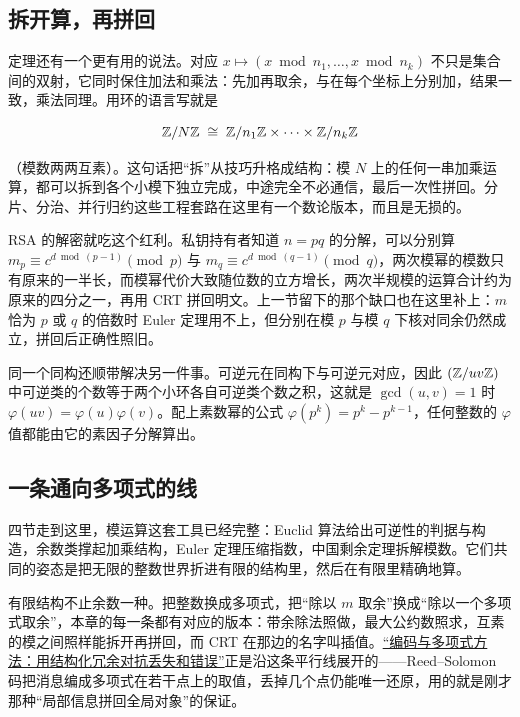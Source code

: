 \subsection{拆开算，再拼回}

定理还有一个更有用的说法。对应 \(x\mapsto(x\bmod n_1,\dots,x\bmod n_k)\) 不只是集合间的双射，它同时保住加法和乘法：先加再取余，与在每个坐标上分别加，结果一致，乘法同理。用环的语言写就是

\[
\mathbb{Z}/N\mathbb{Z}\;\cong\;\mathbb{Z}/n_1\mathbb{Z}\times\cdots\times\mathbb{Z}/n_k\mathbb{Z}
\]

（模数两两互素）。这句话把``拆''从技巧升格成结构：模 \(N\) 上的任何一串加乘运算，都可以拆到各个小模下独立完成，中途完全不必通信，最后一次性拼回。分片、分治、并行归约这些工程套路在这里有一个数论版本，而且是无损的。

RSA 的解密就吃这个红利。私钥持有者知道 \(n=pq\) 的分解，可以分别算 \(m_p\equiv c^{d\bmod(p-1)}\pmod p\) 与 \(m_q\equiv c^{d\bmod(q-1)}\pmod q\)，两次模幂的模数只有原来的一半长，而模幂代价大致随位数的立方增长，两次半规模的运算合计约为原来的四分之一，再用 CRT 拼回明文。上一节留下的那个缺口也在这里补上：\(m\) 恰为 \(p\) 或 \(q\) 的倍数时 Euler 定理用不上，但分别在模 \(p\) 与模 \(q\) 下核对同余仍然成立，拼回后正确性照旧。

同一个同构还顺带解决另一件事。可逆元在同构下与可逆元对应，因此 \((\mathbb{Z}/uv\mathbb{Z})\) 中可逆类的个数等于两个小环各自可逆类个数之积，这就是 \(\gcd(u,v)=1\) 时 \(\varphi(uv)=\varphi(u)\varphi(v)\)。配上素数幂的公式 \(\varphi(p^{k})=p^{k}-p^{k-1}\)，任何整数的 \(\varphi\) 值都能由它的素因子分解算出。

\subsection{一条通向多项式的线}

四节走到这里，模运算这套工具已经完整：Euclid 算法给出可逆性的判据与构造，余数类撑起加乘结构，Euler 定理压缩指数，中国剩余定理拆解模数。它们共同的姿态是把无限的整数世界折进有限的结构里，然后在有限里精确地算。

有限结构不止余数一种。把整数换成多项式，把``除以 \(m\) 取余''换成``除以一个多项式取余''，本章的每一条都有对应的版本：带余除法照做，最大公约数照求，互素的模之间照样能拆开再拼回，而 CRT 在那边的名字叫插值。\hyperref[ch:031]{``编码与多项式方法：用结构化冗余对抗丢失和错误''}正是沿这条平行线展开的——Reed--Solomon 码把消息编成多项式在若干点上的取值，丢掉几个点仍能唯一还原，用的就是刚才那种``局部信息拼回全局对象''的保证。
